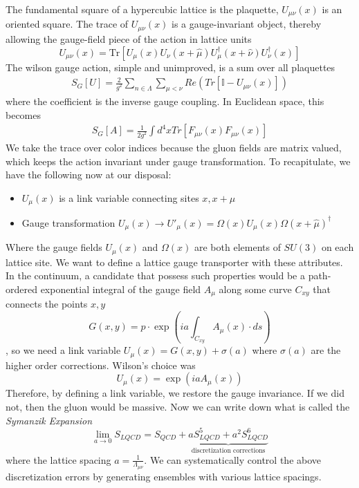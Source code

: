     
The fundamental square of a hypercubic lattice is the plaquette, $U_{\mu\nu}(x)$ is an oriented square. The trace of  $U_{\mu\nu}(x)$ is a gauge-invariant object, thereby allowing the gauge-field piece of the action in lattice units  
\begin{equation}
    U_{\mu\nu}(x) = \text{Tr} \left[ U_\mu(x) U_\nu(x + \hat{\mu}) U_\mu^\dagger(x + \hat{\nu}) U_\nu^\dagger(x) \right]
\end{equation}
The wilson gauge action, simple and unimproved, is a sum over all plaquettes
\begin{align}
    S_G[U] = \frac{2}{g^2} \sum_{n\in\Lambda}^{}\sum_{\mu < \nu}^{} Re\left(Tr\left[\mathbb{I} - U_{\mu\nu}(x)\right]\right)
\end{align}
where the coefficient is the inverse gauge coupling. 
In Euclidean space, this becomes 
\begin{align}
    S_G[A] = \frac{1}{2g^2} \int d^4x Tr\left[F_{\mu\nu}(x) F_{\mu\nu}(x)\right]
\end{align}
We take the trace over color indices because the gluon fields are matrix valued, which keeps the action invariant under gauge transformation. To recapitulate, we have the following now at our disposal:
\begin{itemize}
    \item $U_\mu(x)$ is a link variable connecting sites $x, x+\mu$ 
    \item Gauge transformation $U_\mu(x) \to U'_\mu(x) = \Omega(x)U_\mu(x)\Omega(x+\hat{\mu})^\dagger$
\end{itemize}
Where the gauge fields $U_\mu(x)$ and $\Omega(x)$ are both elements of $SU(3)$ on each lattice site. 
We want to define a lattice gauge transporter with these attributes. In the continuum, a candidate that possess such properties would be a path-ordered exponential integral of the gauge field $A_\mu$ along some curve $C_{xy}$ that connects the points $x,y$ 
\begin{equation}
    G(x,y) = p\cdot \exp\left(ia\int_{C_{xy}}^{}A_\mu(x) \cdot ds\right)
\end{equation},
so we need a link variable $U_\mu(x) = G(x,y) + \sigma(a)$ where $\sigma(a)$ are the higher order corrections. Wilson's choice was 
\begin{equation}
    U_\mu(x) = \exp\left(iaA_\mu(x)\right)
\end{equation}
Therefore, by defining a link variable, we restore the gauge invariance. If we did not, then the gluon would be massive. Now we can write down what is called the \textit{Symanzik Expansion} 
\begin{equation}
    \lim\limits_{a \to 0} S_{LQCD} = S_{QCD} + \underbrace{aS_{LQCD}^5 + a^2 S^6_{LQCD}}_{\text{discretization corrections}}
\end{equation} where the lattice spacing $a = \frac{1}{\Lambda_{\mu\nu}}$. We can systematically control the above discretization errors by generating ensembles with various lattice spacings. 

